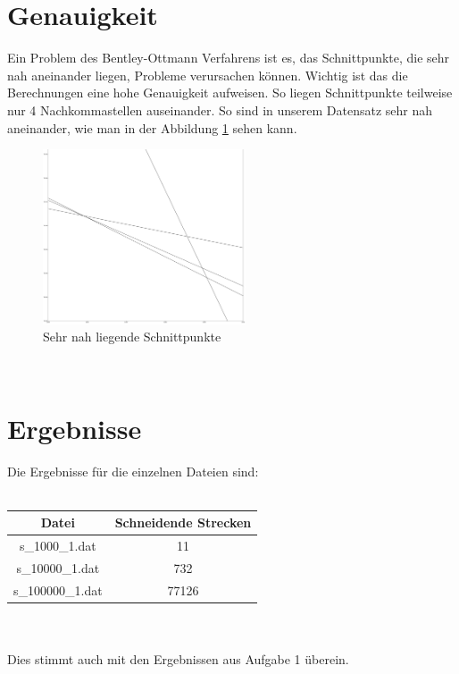 \documentclass[conference]{IEEEtran}
\begin{document}
	\section{Genauigkeit}
	Ein Problem des Bentley-Ottmann Verfahrens ist es, das Schnittpunkte, die sehr nah aneinander liegen, Probleme verursachen können. Wichtig ist das die Berechnungen eine hohe Genauigkeit aufweisen. So liegen Schnittpunkte teilweise nur 4 Nachkommastellen auseinander. So sind in unserem Datensatz sehr nah aneinander, wie man in der Abbildung \ref{close} sehen kann.
	\begin{figure}[h]
		\begin{center}
			\includegraphics[width=6cm]{CloseIntersections.png}
			\caption{Sehr nah liegende Schnittpunkte}
			\label{close}
		\end{center}
	\end{figure}\\

	\section{Ergebnisse}
	Die Ergebnisse für die einzelnen Dateien sind:\\
	\vspace{0.2cm}\\
	\begin{tabular}{|c|c|}
		\hline
		Datei & Schneidende Strecken \\
		\hline
		s\_1000\_1.dat & 11 \\
		\hline
		s\_10000\_1.dat & 732 \\
		\hline
		s\_100000\_1.dat & 77126 \\
		\hline
	\end{tabular}\\
	\vspace{0.2cm}\\
	Dies stimmt auch mit den Ergebnissen aus Aufgabe 1 überein.
\end{document}
